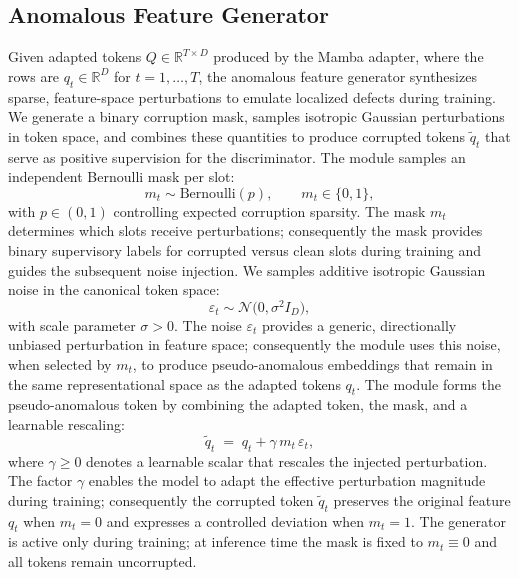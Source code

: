 \subsection{Anomalous Feature Generator}

Given adapted tokens \(Q\in\mathbb{R}^{T\times D}\) produced by the Mamba adapter, where the rows are \(q_t\in\mathbb{R}^D\) for \(t=1,\dots,T\), the anomalous feature generator synthesizes sparse, feature-space perturbations to emulate localized defects during training. We generate a binary corruption mask, samples isotropic Gaussian perturbations in token space, and combines these quantities to produce corrupted tokens \(\tilde{q}_t\) that serve as positive supervision for the discriminator. The module samples an independent Bernoulli mask per slot:
\begin{equation}
m_t \sim \mathrm{Bernoulli}(p),\qquad m_t\in\{0,1\},
\end{equation}
with \(p\in(0,1)\) controlling expected corruption sparsity. The mask \(m_t\) determines which slots receive perturbations; consequently the mask provides binary supervisory labels for corrupted versus clean slots during training and guides the subsequent noise injection. We samples additive isotropic Gaussian noise in the canonical token space:
\begin{equation}
\varepsilon_t \sim \mathcal{N}\big(0,\sigma^2 I_D\big),
\end{equation}
with scale parameter \(\sigma>0\). The noise \(\varepsilon_t\) provides a generic, directionally unbiased perturbation in feature space; consequently the module uses this noise, when selected by \(m_t\), to produce pseudo-anomalous embeddings that remain in the same representational space as the adapted tokens \(q_t\). The module forms the pseudo-anomalous token by combining the adapted token, the mask, and a learnable rescaling:
\begin{equation}
\tilde{q}_t \;=\; q_t + \gamma\, m_t\, \varepsilon_t,
\end{equation}
where \(\gamma\ge 0\) denotes a learnable scalar that rescales the injected perturbation. The factor \(\gamma\) enables the model to adapt the effective perturbation magnitude during training; consequently the corrupted token \(\tilde{q}_t\) preserves the original feature \(q_t\) when \(m_t=0\) and expresses a controlled deviation when \(m_t=1\). The generator is active only during training; at inference time the mask is fixed to \(m_t\equiv 0\) and all tokens remain uncorrupted.

